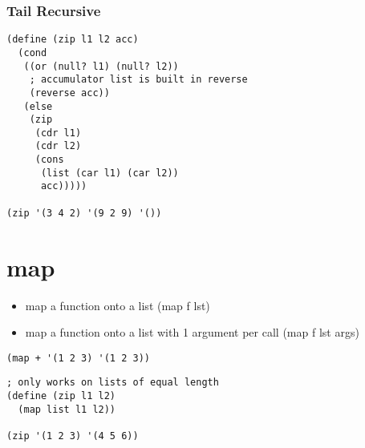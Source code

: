\documentclass[11pt]{article}
\begin{document}
\subsubsection{Tail Recursive}
\label{sec-2-3-2}

\lstset{language=scheme,label= ,caption= ,numbers=none}
\begin{lstlisting}
(define (zip l1 l2 acc)
  (cond
   ((or (null? l1) (null? l2))
    ; accumulator list is built in reverse
    (reverse acc)) 
   (else
    (zip
     (cdr l1)
     (cdr l2)
     (cons
      (list (car l1) (car l2))
      acc)))))

(zip '(3 4 2) '(9 2 9) '())
\end{lstlisting}

\section{map}
\label{sec-3}

\begin{itemize}
\item map a function onto a list (map f lst)
\item map a function onto a list with 1 argument per call (map f lst args)
\end{itemize}

\lstset{language=scheme,label= ,caption= ,numbers=none}
\begin{lstlisting}
(map + '(1 2 3) '(1 2 3))
\end{lstlisting}

\lstset{language=scheme,label= ,caption= ,numbers=none}
\begin{lstlisting}
; only works on lists of equal length
(define (zip l1 l2)
  (map list l1 l2))

(zip '(1 2 3) '(4 5 6))
\end{lstlisting}
\end{document}

